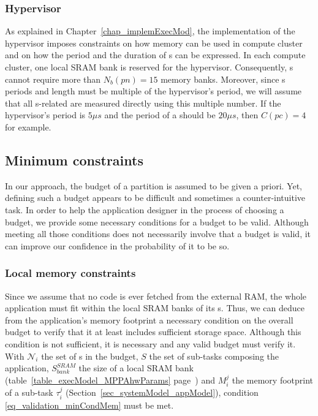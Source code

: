 \documentclass[main.tex]{subfiles}
\begin{document}
\subsubsection{Hypervisor}
As explained in Chapter~\ref{chap_implemExecMod}, the implementation of the hypervisor imposes constraints on how memory can be used in compute cluster and on how the period and the duration of \PC{}s can be expressed. In each compute cluster, one local SRAM bank is reserved for the hypervisor. Consequently, \PN{}s cannot require more than $N_b(pn) = 15$ memory banks. Moreover, since \PC{}s periods and length must be multiple of the hypervisor's period, we will assume that all \PC{}s-related are measured directly using this multiple number. If the hypervisor's period is $5\mu s$ and the period of a \PC{} should be $20 \mu s$, then $C(pc) = 4$ for example.



\subsection{Minimum constraints}
In our approach, the budget of a partition is assumed to be given a priori. Yet, defining such a budget appears to be difficult and sometimes a counter-intuitive task. In order to help the application designer in the process of choosing a budget, we provide some necessary conditions for a budget to be valid. Although meeting all those conditions does not necessarily involve that a budget is valid, it can improve our confidence in the probability of it to be so.

\subsubsection{Local memory constraints}
Since we assume that no code is ever fetched from the external RAM, the whole application must fit within the local SRAM banks of its \PN{}s. Thus, we can deduce from the application's memory footprint a necessary condition on the overall budget to verify that it at least includes sufficient storage space. Although this condition is not sufficient, it is necessary and any valid budget must verify it. With $\mathcal{N}_i$ the set of \PN{}s in the budget, $S$ the set of sub-tasks composing the application, $S_{bank}^{SRAM}$ the size of a local SRAM bank (table~\ref{table_execModel_MPPAhwParams} page~\pageref{table_execModel_MPPAhwParams}) and $M_i^j$ the memory footprint of a sub-task $\tau_i^j$ (Section~\ref{sec_systemModel_appModel}), condition \ref{eq_validation_minCondMem} must be met.
\end{document}
